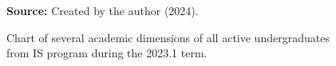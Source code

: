 \begin{figure}[ht!]
\centering

\caption{\textmd{Chart of several academic dimensions of all active undergraduates from \acrshort{IS} program during the 2023.1 term.}}
\label{fig:2023.1-is-term}

\par\medskip\ABNTEXfontereduzida\selectfont\textbf{Source:} Created by the author (2024).
\end{figure}

                

        
